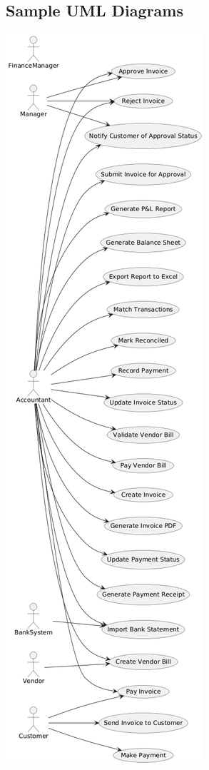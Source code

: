 \documentclass[11pt,a4paper]{article}
\begin{document}
\subsection{Sample UML Diagrams}
\begin{minipage}{0.45\textwidth}
    \centering
    \includegraphics[width=\linewidth, height=0.8\textheight, keepaspectratio]{diagram/use_case_accounting.png}
\end{minipage}%
\end{document}
